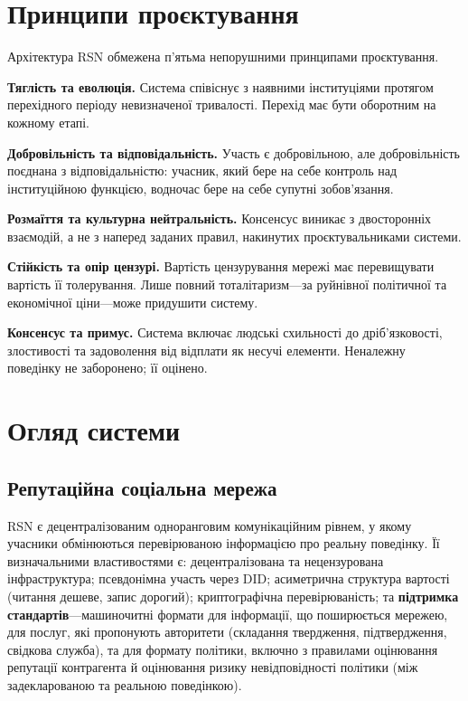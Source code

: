 \documentclass[11pt,a4paper,twocolumn]{article}
\begin{document}
\section{Принципи проєктування}

Архітектура RSN обмежена п'ятьма непорушними принципами проєктування.

\textbf{Тяглість та еволюція.} Система співіснує з наявними інституціями протягом перехідного періоду невизначеної тривалості. Перехід має бути оборотним на кожному етапі.

\textbf{Добровільність та відповідальність.} Участь є добровільною, але добровільність поєднана з відповідальністю: учасник, який бере на себе контроль над інституційною функцією, водночас бере на себе супутні зобов'язання.

\textbf{Розмаїття та культурна нейтральність.} Консенсус виникає з двосторонніх взаємодій, а не з наперед заданих правил, накинутих проєктувальниками системи.

\textbf{Стійкість та опір цензурі.} Вартість цензурування мережі має перевищувати вартість її толерування. Лише повний тоталітаризм---за руйнівної політичної та економічної ціни---може придушити систему.

\textbf{Консенсус та примус.} Система включає людські схильності до дріб'язковості, злостивості та задоволення від відплати як несучі елементи. Неналежну поведінку не заборонено; її оцінено.

\section{Огляд системи}

\subsection{Репутаційна соціальна мережа}

RSN є децентралізованим одноранговим комунікаційним рівнем, у якому учасники обмінюються перевірюваною інформацією про реальну поведінку. Її визначальними властивостями є: децентралізована та нецензурована інфраструктура; псевдонімна участь через DID; асиметрична структура вартості (читання дешеве, запис дорогий); криптографічна перевірюваність; та \textbf{підтримка стандартів}---машиночитні формати для інформації, що поширюється мережею, для послуг, які пропонують авторитети (складання твердження, підтвердження, свідкова служба), та для формату політики, включно з правилами оцінювання репутації контрагента й оцінювання ризику невідповідності політики (між задекларованою та реальною поведінкою).
\end{document}
